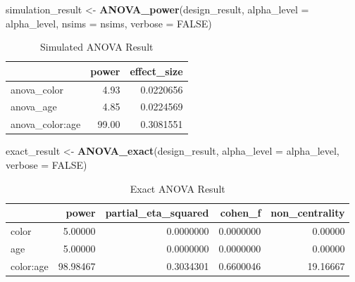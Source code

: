\documentclass[
]{book}
\newenvironment{Shaded}{\begin{snugshade}}{\end{snugshade}}
\newcommand{\DataTypeTok}[1]{\textcolor[rgb]{0.13,0.29,0.53}{#1}}
\newcommand{\KeywordTok}[1]{\textcolor[rgb]{0.13,0.29,0.53}{\textbf{#1}}}
\newcommand{\NormalTok}[1]{#1}
\newcommand{\OtherTok}[1]{\textcolor[rgb]{0.56,0.35,0.01}{#1}}
\newcommand{\StringTok}[1]{\textcolor[rgb]{0.31,0.60,0.02}{#1}}
\begin{document}
\begin{Shaded}
\begin{Highlighting}[]
\NormalTok{simulation_result <-}\StringTok{ }\KeywordTok{ANOVA_power}\NormalTok{(design_result, }
                                 \DataTypeTok{alpha_level =}\NormalTok{ alpha_level, }
                                 \DataTypeTok{nsims =}\NormalTok{ nsims,}
                                 \DataTypeTok{verbose =} \OtherTok{FALSE}\NormalTok{)}
\end{Highlighting}
\end{Shaded}

\begin{table}[!h]

\caption{\label{tab:unnamed-chunk-152}Simulated ANOVA Result}
\centering
\begin{tabular}[t]{l|r|r}
\hline
  & power & effect\_size\\
\hline
anova\_color & 4.93 & 0.0220656\\
\hline
anova\_age & 4.85 & 0.0224569\\
\hline
anova\_color:age & 99.00 & 0.3081551\\
\hline
\end{tabular}
\end{table}

\begin{Shaded}
\begin{Highlighting}[]
\NormalTok{exact_result <-}\StringTok{ }\KeywordTok{ANOVA_exact}\NormalTok{(design_result,}
                            \DataTypeTok{alpha_level =}\NormalTok{ alpha_level,}
                            \DataTypeTok{verbose =} \OtherTok{FALSE}\NormalTok{)}
\end{Highlighting}
\end{Shaded}

\begin{table}[!h]

\caption{\label{tab:unnamed-chunk-154}Exact ANOVA Result}
\centering
\begin{tabular}[t]{l|r|r|r|r}
\hline
  & power & partial\_eta\_squared & cohen\_f & non\_centrality\\
\hline
color & 5.00000 & 0.0000000 & 0.0000000 & 0.00000\\
\hline
age & 5.00000 & 0.0000000 & 0.0000000 & 0.00000\\
\hline
color:age & 98.98467 & 0.3034301 & 0.6600046 & 19.16667\\
\hline
\end{tabular}
\end{table}
\end{document}
